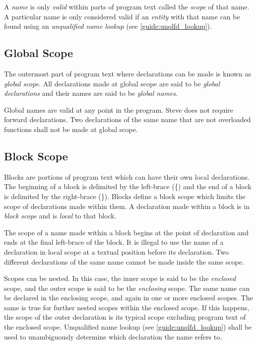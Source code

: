 A \textit{name} is only \textit{valid} within parts of program text called the \textit{scope} of that name. A particular name is only considered valid if an \textit{entity} with that name can be found using an \textit{unqualified name lookup} (see \ref{guide:unqlfd_lookup}).

\subsection{Global Scope} \label{guide:global_scope}

The outermost part of program text where declarations can be made is known as \textit{global scope}. All declarations made at global scope are said to be \textit{global declarations} and their names are said to be \textit{global names}.

Global names are valid at any point in the program. Steve does not require forward declarations. Two declarations of the same name that are not overloaded functions shall not be made at global scope.

\subsection{Block Scope} \label{guide:block_scope}

Blocks are portions of program text which can have their own local declarations. The beginning of a block is delimited by the left-brace (\{) and the end of a block is delimited by the right-brace (\}). Blocks define a block scope which limits the scope of declarations made within them. A declaration made within a block is in \textit{block scope} and is \textit{local} to that block.

The scope of a name made within a block begins at the point of declaration and ends at the final left-brace of the block. It is illegal to use the name of a declaration in local scope at a textual position before its declaration.
Two different declarations of the same name cannot be made inside the same scope.

Scopes can be nested. In this case, the inner scope is said to be the \textit{enclosed} scope, and the outer scope is said to be the \textit{enclosing} scope. The same name can be declared in the enclosing scope, and again in one or more enclosed scopes. The same is true for further nested scopes within the enclosed scope. If this happens, the scope of the outer declaration is its typical scope excluding program text of the enclosed scope. Unqualified name lookup (see \ref{guide:unqlfd_lookup}) shall be used to unambiguously determine which declaration the name refers to.

